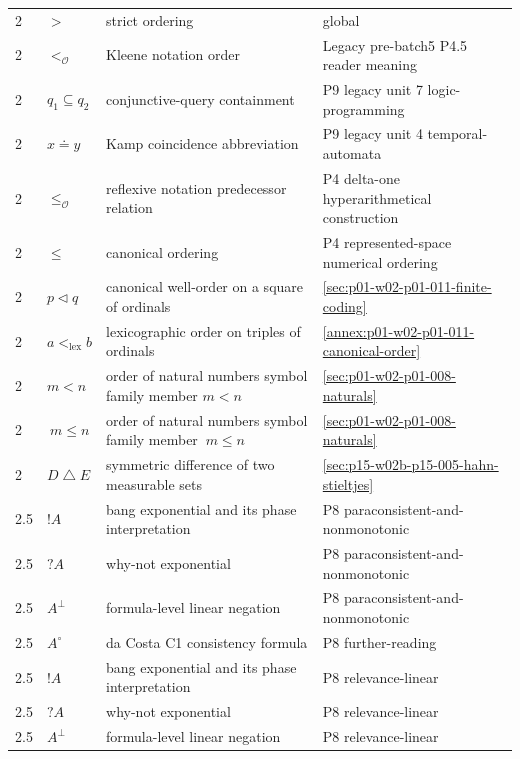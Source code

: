 \begin{longtable}{@{}p{}p{}p{}p{}@{}}
2 & \(>\) & strict ordering & global \\
2 & \(<_{\mathcal O}\) & Kleene notation order & Legacy pre-batch5 P4.5 reader meaning \\
2 & \(q_1\subseteq q_2\) & conjunctive-query containment & P9 legacy unit 7 logic-programming \\
2 & \(x\doteq y\) & Kamp coincidence abbreviation & P9 legacy unit 4 temporal-automata \\
2 & \(\leq_{\mathcal O}\) & reflexive notation predecessor relation & P4 delta-one hyperarithmetical construction \\
2 & \(\leq\) & canonical ordering & P4 represented-space numerical ordering \\
2 & \(p\lhd q\) & canonical well-order on a square of ordinals & \hyperref[sec:p01-w02-p01-011-finite-coding]{\ref*{sec:p01-w02-p01-011-finite-coding}} \\
2 & \(a<_{\mathrm{lex}}b\) & lexicographic order on triples of ordinals & \hyperref[annex:p01-w02-p01-011-canonical-order]{\ref*{annex:p01-w02-p01-011-canonical-order}} \\
2 & \(m<n\) & order of natural numbers symbol family member \(m<n\) & \hyperref[sec:p01-w02-p01-008-naturals]{\ref*{sec:p01-w02-p01-008-naturals}} \\
2 & \(\ m\leq n\) & order of natural numbers symbol family member \(\ m\leq n\) & \hyperref[sec:p01-w02-p01-008-naturals]{\ref*{sec:p01-w02-p01-008-naturals}} \\
2 & \(D\mathbin{\triangle}E\) & symmetric difference of two measurable sets & \hyperref[sec:p15-w02b-p15-005-hahn-stieltjes]{\ref*{sec:p15-w02b-p15-005-hahn-stieltjes}} \\
2.5 & \(!A\) & bang exponential and its phase interpretation & P8 paraconsistent-and-nonmonotonic \\
2.5 & \(?A\) & why-not exponential & P8 paraconsistent-and-nonmonotonic \\
2.5 & \(A^\perp\) & formula-level linear negation & P8 paraconsistent-and-nonmonotonic \\
2.5 & \(A^\circ\) & da Costa C1 consistency formula & P8 further-reading \\
2.5 & \(!A\) & bang exponential and its phase interpretation & P8 relevance-linear \\
2.5 & \(?A\) & why-not exponential & P8 relevance-linear \\
2.5 & \(A^\perp\) & formula-level linear negation & P8 relevance-linear \\

\end{longtable}

